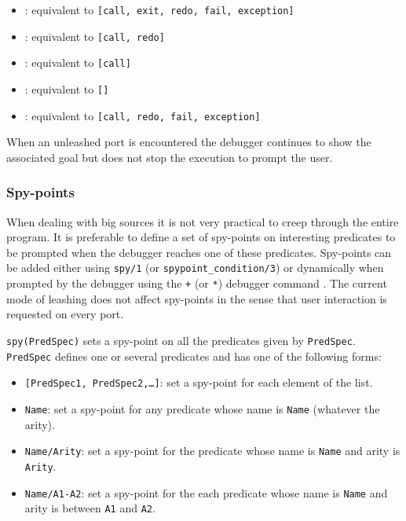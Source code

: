 \begin{itemize}

\item {}: equivalent to \texttt{[call, exit, redo, fail,
exception]}

\item {}: equivalent to \texttt{[call, redo]}

\item {}: equivalent to \texttt{[call]}

\item {}: equivalent to \texttt{[]}

\item {}: equivalent to \texttt{[call, redo, fail,
exception]}

\end{itemize}

When an unleashed port is encountered the debugger continues to show the
associated goal but does not stop the execution to prompt the user. 

\subsubsection{Spy-points}
\label{Spy-points}

When dealing with big sources it is not very practical to creep through the
entire program. It is preferable to define a set of spy-points on
interesting predicates to be prompted when the debugger reaches one of these
predicates. Spy-points can be added either using \texttt{spy/1} (or
\texttt{spypoint\_condition/3}) or dynamically when prompted by the debugger
using the \texttt{+} (or \texttt{*}) debugger command
. The current mode of leashing does not
affect spy-points in the sense that user interaction is requested on
every port.

\texttt{spy(PredSpec)} sets a spy-point on all the predicates given by
\texttt{PredSpec}. \texttt{PredSpec} defines one or several predicates and
has one of the following forms:

\begin{itemize}

\item \texttt{[PredSpec1, PredSpec2,\ldots]}: set a spy-point for each
element of the list.

\item \texttt{Name}: set a spy-point for any predicate whose name is
\texttt{Name} (whatever the arity).

\item \texttt{Name/Arity}: set a spy-point for the predicate whose name is
\texttt{Name} and arity is \texttt{Arity}.

\item \texttt{Name/A1-A2}: set a spy-point for the each predicate whose name
is \texttt{Name} and arity is between \texttt{A1} and \texttt{A2}.

\end{itemize}

